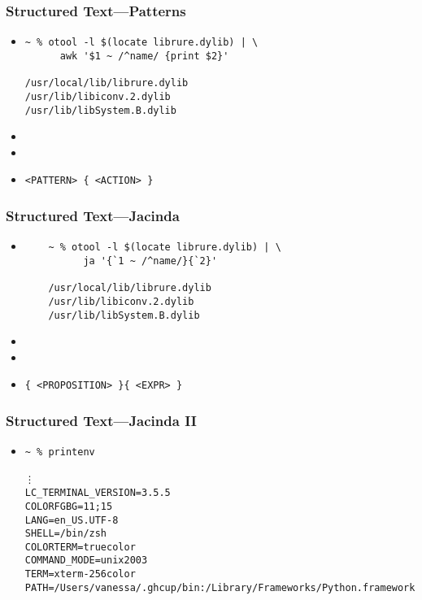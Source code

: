 \documentclass{beamer}
\begin{document}
\begin{frame}[fragile]
  \frametitle{Structured Text---Patterns}
  \begin{itemize}
    \item
      \begin{verbatim}
~ % otool -l $(locate librure.dylib) | \
      awk '$1 ~ /^name/ {print $2}'

/usr/local/lib/librure.dylib
/usr/lib/libiconv.2.dylib
/usr/lib/libSystem.B.dylib
      \end{verbatim}
      \item\nil{}
      \item\nil{}
      \item \verb|<PATTERN> { <ACTION> }|
  \end{itemize}
\end{frame}

\begin{frame}[fragile]
  \frametitle{Structured Text---Jacinda}
  \begin{itemize}
    \item
      \begin{verbatim}
    ~ % otool -l $(locate librure.dylib) | \
          ja '{`1 ~ /^name/}{`2}'

    /usr/local/lib/librure.dylib
    /usr/lib/libiconv.2.dylib
    /usr/lib/libSystem.B.dylib
      \end{verbatim}
    \item\nil{}
    \item\nil{}
    \item \verb|{ <PROPOSITION> }{ <EXPR> }|
  \end{itemize}
\end{frame}

\begin{frame}[fragile]
  \frametitle{Structured Text---Jacinda II}
  \begin{itemize}
    \item
      \begin{verbatim}
~ % printenv

⋮
LC_TERMINAL_VERSION=3.5.5
COLORFGBG=11;15
LANG=en_US.UTF-8
SHELL=/bin/zsh
COLORTERM=truecolor
COMMAND_MODE=unix2003
TERM=xterm-256color
PATH=/Users/vanessa/.ghcup/bin:/Library/Frameworks/Python.framework/
      \end{verbatim}
  \end{itemize}
\end{frame}
\end{document}
